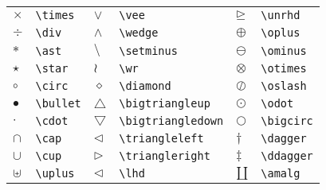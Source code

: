 \begin{tabular}{llllll}
$\times$             & \verb+\times+             & $\vee$                  & \verb+\vee+                & $\unrhd$       & \verb+\unrhd+ \\
$\div$               & \verb+\div+               & $\wedge$                & \verb+\wedge+              & $\oplus$       & \verb+\oplus+ \\
$\ast$               & \verb+\ast+               & $\setminus$             & \verb+\setminus+           & $\ominus$      & \verb+\ominus+ \\
$\star$              & \verb+\star+              & $\wr$                   & \verb+\wr+                 & $\otimes$      & \verb+\otimes+ \\
$\circ$              & \verb+\circ+              & $\diamond$              & \verb+\diamond+            & $\oslash$      & \verb+\oslash+ \\
$\bullet$            & \verb+\bullet+            & $\bigtriangleup$        & \verb+\bigtriangleup+      & $\odot$        & \verb+\odot+ \\
$\cdot$              & \verb+\cdot+              & $\bigtriangledown$      & \verb+\bigtriangledown+    & $\bigcirc$     & \verb+\bigcirc+ \\
$\cap$               & \verb+\cap+               & $\triangleleft$         & \verb+\triangleleft+       & $\dagger$      & \verb+\dagger+ \\
$\cup$               & \verb+\cup+               & $\triangleright$        & \verb+\triangleright+      & $\ddagger$     & \verb+\ddagger+ \\
$\uplus$             & \verb+\uplus+             & $\lhd$                  & \verb+\lhd+                & $\amalg$       & \verb+\amalg+ \\
\end{tabular}          
\newpage
